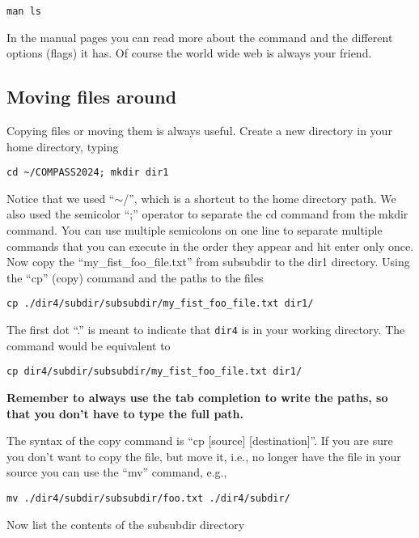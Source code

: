 \documentclass[aps,showpacs,prd,notitlepage,preprintnumbers,amsmath,amssymb,letterpaper]{revtex4}
\begin{document}
\begin{verbatim}
man ls
\end{verbatim}

In the manual pages you can read more about the command and the
different options (flags) it has. Of course the world wide web is always
your friend.

\subsection{Moving files around}

Copying files or moving them is always useful. Create a new directory in your home directory, typing

\begin{verbatim}
cd ~/COMPASS2024; mkdir dir1
\end{verbatim}

Notice that we used ``$\sim$/'', which is a shortcut to the home
directory path. We also used the semicolor ``;'' operator to separate
the cd command from the mkdir command. You can use multiple semicolons
on one line to separate multiple commands that you can execute in the
order they appear and hit enter only once. Now copy the
``my\_fist\_foo\_file.txt'' from subsubdir to the dir1
directory. Using the ``cp'' (copy) command and the paths to the files

\begin{verbatim}
cp ./dir4/subdir/subsubdir/my_fist_foo_file.txt dir1/
\end{verbatim}

The first dot ``.'' is meant to indicate that {\tt dir4} is in your working directory.
The command would be equivalent to

\begin{verbatim}
cp dir4/subdir/subsubdir/my_fist_foo_file.txt dir1/
\end{verbatim}


{\bf Remember to always use the tab completion to write the paths, so
  that you don't have to type the full path.}


The syntax of the copy command is ``cp [source] [destination]''. If you are sure
you don't want to copy the file, but move it, i.e., no longer have the file
in your source you can use the ``mv'' command, e.g.,

\begin{verbatim}
mv ./dir4/subdir/subsubdir/foo.txt ./dir4/subdir/
\end{verbatim}

Now list the contents of the subsubdir directory
\end{document}
